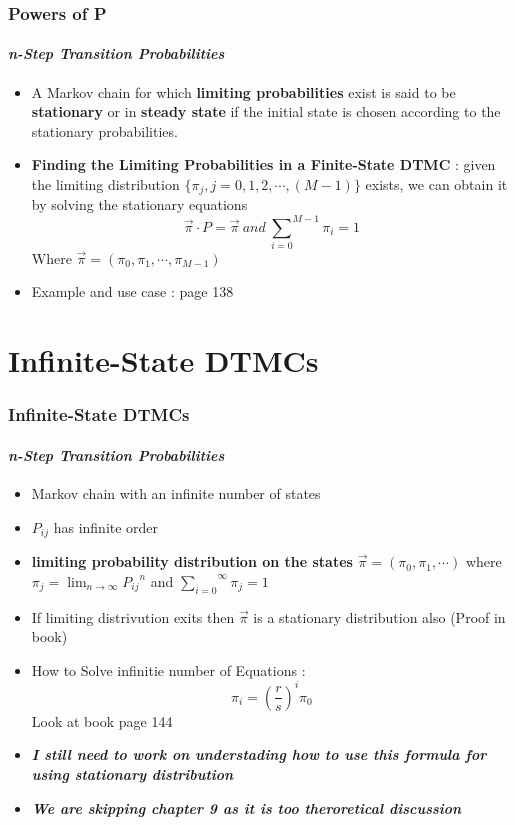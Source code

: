 \documentclass{beamer}
\begin{document}
\begin{frame}
\frametitle{Powers of P}
\framesubtitle{\textbf{\textit{ n-Step Transition Probabilities}}}
\begin{itemize}
\item A Markov chain for which  \textbf{limiting probabilities} exist is said to be \textbf{stationary} or in \textbf{steady state} if the initial state is chosen according to the stationary probabilities.

\item \textbf{Finding the Limiting Probabilities in a Finite-State DTMC} :  given the limiting distribution $\{ {\pi}_j,j=0,1,2,\cdots , (M-1)\}$
exists, we can obtain it by solving the stationary equations
$$\overrightarrow{\pi} \cdot P =  \overrightarrow{\pi} \: and  \: {{\sum}_{i=0}}^{M-1} \pi_{i}= 1$$
Where $\overrightarrow{\pi} = (\pi_0 , \pi_1 , \cdots , \pi_{M-1})$

\item Example and use case : page 138
\end{itemize}
\end{frame}

\section{Infinite-State DTMCs}

\begin{frame}
\frametitle{Infinite-State DTMCs}
\framesubtitle{\textbf{\textit{ n-Step Transition Probabilities}}}
\begin{itemize}
\item Markov chain with an infinite number of states
\item \textbf{$P_{ij}$}  has infinite order
\item \textbf{limiting probability distribution on the states}
$\overrightarrow{\pi} = (\pi_0 , \pi_1 , \cdots ) $   where 
$ \pi_{j}= {\lim}_{n \rightarrow \infty} {{P}_{ij}}^n $ and 
${{\sum}_{i=0}}^{\infty} \pi_{j}= 1$

\item If limiting distrivution exits then $\overrightarrow{\pi} $ is a stationary distribution also (Proof in book)

\item {How to Solve infinitie number of Equations :}
$$\pi_i = (\frac{r}{s})^i \pi_0$$
Look at book page 144


\item \textbf{\textit{I still need to work on understading how to use this formula for using stationary distribution}}

\item \textbf{\textit{We are skipping chapter 9 as it is too theroretical discussion}}
\end{itemize}
\end{frame}
   
\end{document}
